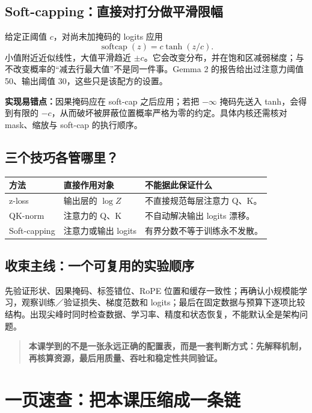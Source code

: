 \documentclass[UTF8,fontset=fandol,zihao=-4,a4paper]{ctexart}
\newcommand{\focus}[1]{\begin{quote}\small\color{accent}\bfseries #1\end{quote}}
\newcommand{\nextpage}{\clearpage}
\begin{document}
\subsection{Soft-capping：直接对打分做平滑限幅}
给定正阈值 $c$，对尚未加掩码的 logits 应用
\[
\operatorname{softcap}(z)=c\tanh(z/c).
\]
小值附近近似线性，大值平滑趋近 $\pm c$。它会改变分布，并在饱和区减弱梯度；与不改变概率的“减去行最大值”不是同一件事。Gemma 2 的报告给出过注意力阈值 50、输出阈值 30，这些只是该配方的设置。

\textbf{实现易错点：}因果掩码应在 soft-cap 之后应用；若把 $-\infty$ 掩码先送入 tanh，会得到有限的 $-c$，从而破坏被屏蔽位置概率严格为零的约定。具体内核还需核对 mask、缩放与 soft-cap 的执行顺序。

\subsection{三个技巧各管哪里？}
\par\noindent\begin{tabularx}{\linewidth}{@{}P{24mm}P{30mm}Y@{}}
\toprule
方法 & 直接作用对象 & 不能据此保证什么\\
\midrule
z-loss & 输出层的 $\log Z$ & 不直接规范每层注意力 Q、K。\\
QK-norm & 注意力的 Q、K & 不自动解决输出 logits 漂移。\\
Soft-capping & 注意力或输出 logits & 有界分数不等于训练永不发散。\\
\bottomrule
\end{tabularx}

\subsection{收束主线：一个可复用的实验顺序}
先验证形状、因果掩码、标签错位、RoPE 位置和缓存一致性；再确认小规模能学习，观察训练／验证损失、梯度范数和 logits；最后在固定数据与预算下逐项比较结构。出现尖峰时同时检查数据、学习率、精度和状态恢复，不能默认全是架构问题。

\focus{本课学到的不是一张永远正确的配置表，而是一套判断方式：先解释机制，再核算资源，最后用质量、吞吐和稳定性共同验证。}

\nextpage
\section{一页速查：把本课压缩成一条链}\label{sec:review}
\end{document}
